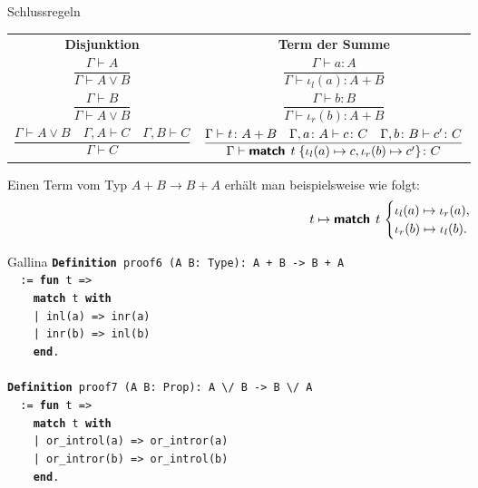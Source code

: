 \documentclass[8pt]{beamer}
\newcommand{\strong}[1]{\textsf{\textbf{#1}}}
\newcommand{\kw}[1]{\textbf{#1}}
\begin{document}
\begin{frame}
\begin{block}{Schlussregeln}
\begin{center}
\begin{tabular}{c@{\qquad\qquad}c}
\strong{Disjunktion}
& \strong{Term der Summe}\\[10pt]
$\dfrac{\Gamma\vdash A}{\Gamma\vdash A\lor B}$
& $\dfrac{\Gamma\vdash a\colon A}{\Gamma\vdash\iota_l(a)\colon A+B}$\\[18pt]
$\dfrac{\Gamma\vdash B}{\Gamma\vdash A\lor B}$
& $\dfrac{\Gamma\vdash b\colon B}{\Gamma\vdash\iota_r(b)\colon A+B}$\\[18pt]
$\dfrac{\Gamma\vdash A\lor B\quad\Gamma,A\vdash C\quad\Gamma,B\vdash C}{\Gamma\vdash C}$
& $\dfrac{\Gamma\vdash t\colon A+B\quad\Gamma,a\colon A\vdash c\colon C
  \quad\Gamma,b\colon B\vdash c'\colon C}{\Gamma\vdash\strong{match}\;\,t\;\{\iota_l(a)\mapsto c, \iota_r(b)\mapsto c'\}\colon C}$
\end{tabular}
\end{center}
\end{block}
\end{frame}

\begin{frame}
Einen Term vom Typ $A+B\to B+A$ erhält man beispielsweise wie folgt:\pause
\[t\mapsto\strong{match}\;\,t\,\begin{cases}
\iota_l(a)\mapsto\iota_r(a),\\
\iota_r(b)\mapsto\iota_l(b).
\end{cases}\]\pause
\begin{block}{Gallina}
\texttt{\kw{Definition} proof6 (A B: Type): A + B -> B + A\\
\ \ := \kw{fun} t =>\\
\ \ \ \ \kw{match} t \kw{with}\\
\ \ \ \ | inl(a) => inr(a)\\
\ \ \ \ | inr(b) => inl(b)\\
\ \ \ \ \kw{end}.}\\
\mbox{}\\
\texttt{\kw{Definition} proof7 (A B: Prop): A {\textbackslash}/ B -> B {\textbackslash}/ A\\
\ \ := \kw{fun} t =>\\
\ \ \ \ \kw{match} t \kw{with}\\
\ \ \ \ | or\_introl(a) => or\_intror(a)\\
\ \ \ \ | or\_intror(b) => or\_introl(b)\\
\ \ \ \ \kw{end}.}
\end{block}
\end{frame}
\end{document}
